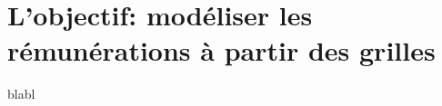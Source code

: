 \documentclass[11pt,a4paper]{article}
\begin{document}
\else \fi



\section{L'objectif: modéliser les rémunérations à partir des grilles}


blabl



\ifx\isEmbedded\undefined
\newpage
 

\end{document}
